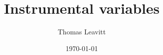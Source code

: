\documentclass[table, xcolor={dvipsnames}, 9pt]{beamer}
\title[]{Instrumental variables} %
\author{Thomas Leavitt} %
\institute[] %
{
\medskip
\textit{} %
}
\date{\today} %
\theoremstyle{newstyle}
\begin{document}
\begin{frame}
\titlepage %
\end{frame}


\end{document}
